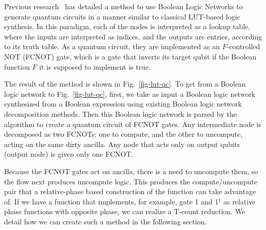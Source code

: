 \documentclass[a4paper]{article}
\begin{document}
{%


Previous research~\cite{bib-lhrs-soeken} has detailed a method to use Boolean Logic
Networks to generate quantum circuits in a manner similar to classical LUT-based logic 
synthesis. In this paradigm, each of the nodes is interpreted as a lookup table, 
where the inputs are interpreted as indices, and the outputs are entries, according 
to its truth table. As a quantum circuit, they are implemented as an $F$-controlled NOT (FCNOT) gate,
which is a gate that inverts its target qubit if the Boolean function $F$ it is supposed to
implement is true.

The result of the method is shown in Fig.~\ref{fig-lut-qc}. To get from a Boolean logic network to Fig.~\ref{fig-lut-qc}, first, we take as input a Boolean logic network synthesized from a Boolean expression using existing Boolean logic network decomposition methods. Then this Boolean logic network is parsed by the algorithm to create a quantum circuit of FCNOT gates. Any intermediate node is decomposed as two FCNOTs: one to compute, and the other to uncompute, acting on the same dirty ancilla. Any node that acts only on output qubits (output node) is given only one FCNOT.


Because the FCNOT gates act on ancilla, there is a need to uncompute them, so the flow next produces uncompute logic. This produces the compute/uncompute pair that a relative-phase based construction of the function can take advantage of. If we have a function that implements, for example, gate 1 and 1$^{\dagger}$ as relative phase functions
with opposite phase, we can realize a T-count reduction. We detail how we can create such a method in the
following section.

}
\end{document}
